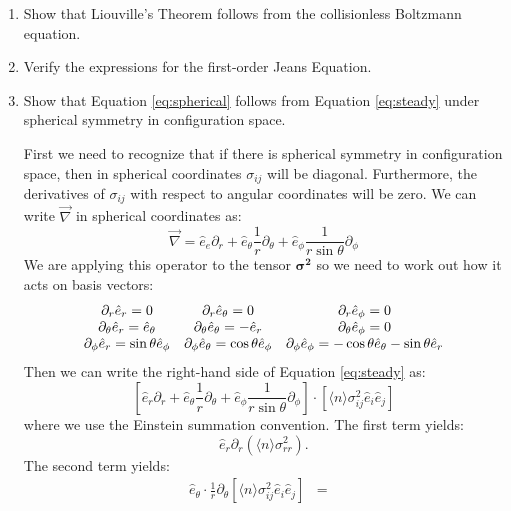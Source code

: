 \begin{enumerate}
\item Show that Liouville's Theorem follows from the collisionless
Boltzmann equation. 
\item Verify the expressions for the first-order Jeans Equation. 
\item Show that Equation \ref{eq:spherical} follows from
Equation \ref{eq:steady} under spherical symmetry in configuration
space. 
\begin{answer}
First we need to recognize that if there is spherical symmetry in
configuration space, then in spherical coordinates $\sigma_{ij}$ will
be diagonal. Furthermore, the derivatives of $\sigma_{ij}$ with
respect to angular coordinates will be zero. We can write
$\vec{\nabla}$ in spherical coordinates as:
\begin{equation}
\vec{\nabla} = {\hat e}_e \partial_r + {\hat
e}_\theta \frac{1}{r} \partial_\theta + {\hat
e}_\phi \frac{1}{r\sin\theta} \partial_\phi
\end{equation}
We are applying this operator to the tensor $\mathbf{\sigma^2}$ so we
need to work out how it acts on basis vectors:
\begin{equation}
\begin{array}{ccc}
\partial_r {\hat e}_r = 0 & 
\partial_r {\hat e}_\theta = 0 &
\partial_r {\hat e}_\phi = 0 \cr
\partial_\theta {\hat e}_r = {\hat e}_\theta & 
\partial_\theta {\hat e}_\theta = - {\hat e}_r &
\partial_\theta {\hat e}_\phi = 0 \cr
\partial_\phi {\hat e}_r = \sin\theta {\hat e}_\phi & 
\partial_\phi {\hat e}_\theta = \cos\theta {\hat e}_\phi &
\partial_\phi {\hat e}_\phi = - \cos\theta {\hat e}_\theta - \sin\theta {\hat e}_r \cr
\end{array}
\end{equation}
Then we can write the right-hand side of Equation \ref{eq:steady} as:
\begin{equation}
\left[{\hat e}_r \partial_r +
{\hat e}_\theta \frac{1}{r} \partial_\theta + 
{\hat e}_\phi \frac{1}{r\sin\theta} \partial_\phi\right] \cdot
\left[ \langle n\rangle \sigma_{ij}^2 {\hat e}_i {\hat e}_j \right]
\end{equation}
where we use the Einstein summation convention. The first term yields:
\begin{equation}
{\hat e}_r \partial_r \left(\langle n\rangle \sigma_{rr}^2\right).
\end{equation}
The second term yields:
\begin{eqnarray}
{\hat e}_\theta \cdot \frac{1}{r} \partial_\theta \left[ \langle
n\rangle \sigma_{ij}^2 {\hat e}_i {\hat e}_j \right] &=& 

\end{eqnarray}
\end{answer}
\end{enumerate}
